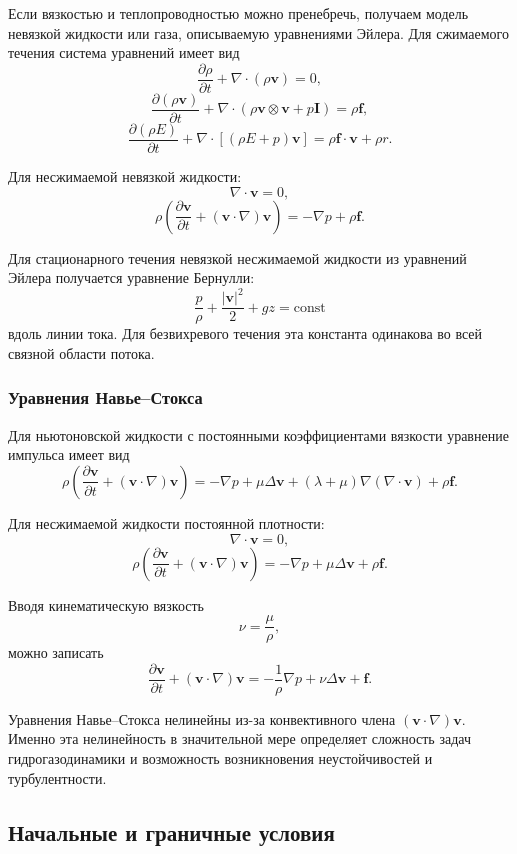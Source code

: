 Если вязкостью и теплопроводностью можно пренебречь, получаем модель невязкой жидкости или газа, описываемую уравнениями Эйлера. Для сжимаемого течения система уравнений имеет вид
\[
\frac{\partial \rho}{\partial t}
+
\nabla\cdot(\rho\mathbf{v})
=
0,
\]
\[
\frac{\partial(\rho\mathbf{v})}{\partial t}
+
\nabla\cdot
\left(
\rho\mathbf{v}\otimes\mathbf{v}
+
p\mathbf{I}
\right)
=
\rho\mathbf{f},
\]
\[
\frac{\partial(\rho E)}{\partial t}
+
\nabla\cdot
\left[
(\rho E+p)\mathbf{v}
\right]
=
\rho\mathbf{f}\cdot\mathbf{v}
+
\rho r.
\]

Для несжимаемой невязкой жидкости:
\[
\nabla\cdot\mathbf{v}=0,
\]
\[
\rho
\left(
\frac{\partial\mathbf{v}}{\partial t}
+
(\mathbf{v}\cdot\nabla)\mathbf{v}
\right)
=
-\nabla p+\rho\mathbf{f}.
\]

Для стационарного течения невязкой несжимаемой жидкости из уравнений Эйлера получается уравнение Бернулли:
\[
\frac{p}{\rho}
+
\frac{|\mathbf{v}|^2}{2}
+
gz
=
\mathrm{const}
\]
вдоль линии тока. Для безвихревого течения эта константа одинакова во всей связной области потока.

\subsubsection*{Уравнения Навье--Стокса}

Для ньютоновской жидкости с постоянными коэффициентами вязкости уравнение импульса имеет вид
\[
\rho
\left(
\frac{\partial\mathbf{v}}{\partial t}
+
(\mathbf{v}\cdot\nabla)\mathbf{v}
\right)
=
-\nabla p
+
\mu\Delta\mathbf{v}
+
(\lambda+\mu)\nabla(\nabla\cdot\mathbf{v})
+
\rho\mathbf{f}.
\]

Для несжимаемой жидкости постоянной плотности:
\[
\nabla\cdot\mathbf{v}=0,
\]
\[
\rho
\left(
\frac{\partial\mathbf{v}}{\partial t}
+
(\mathbf{v}\cdot\nabla)\mathbf{v}
\right)
=
-\nabla p
+
\mu\Delta\mathbf{v}
+
\rho\mathbf{f}.
\]

Вводя кинематическую вязкость
\[
\nu=\frac{\mu}{\rho},
\]
можно записать
\[
\frac{\partial\mathbf{v}}{\partial t}
+
(\mathbf{v}\cdot\nabla)\mathbf{v}
=
-\frac{1}{\rho}\nabla p
+
\nu\Delta\mathbf{v}
+
\mathbf{f}.
\]

Уравнения Навье--Стокса нелинейны из-за конвективного члена
$(\mathbf{v}\cdot\nabla)\mathbf{v}$. Именно эта нелинейность в значительной мере
определяет сложность задач гидрогазодинамики и возможность возникновения неустойчивостей и турбулентности.

\subsection{Начальные и граничные условия}

